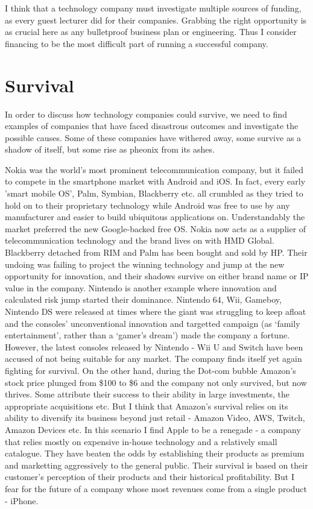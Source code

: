 \documentclass[twocolumn]{bmcart}%
\begin{document}
\par I think that a technology company must investigate multiple sources of funding, as every guest lecturer did for their companies. Grabbing the right opportunity is as crucial here as any bulletproof business plan or engineering. Thus I consider financing to be the most difficult part of running a successful company.

\section*{Survival}

In order to discuss how technology companies could survive, we need to find examples of companies that have faced disastrous outcomes and investigate the possible causes. Some of these companies have withered away, some survive as a shadow of itself, but some rise as pheonix from its ashes.\\

\par Nokia was the world's most prominent telecommunication company, but it failed to compete in the smartphone market with Android and iOS. In fact, every early 'smart mobile OS', Palm, Symbian, Blackberry etc. all crumbled as they tried to hold on to their proprietary technology while Android was free to use by any manufacturer and easier to build ubiquitous applications on. Understandably the market preferred the new Google-backed free OS. Nokia now acts as a supplier of telecommunication technology and the brand lives on with HMD Global. Blackberry detached from RIM and Palm has been bought and sold by HP. Their undoing was failing to project the winning technology and jump at the new opportunity for innovation, and their shadows survive on either brand name or IP value in the company. Nintendo is another example where innovation and calculated risk jump started their dominance. Nintendo 64, Wii, Gameboy, Nintendo DS were released at times where the giant was struggling to keep afloat and the consoles' unconventional innovation and targetted campaign (as `family entertainment', rather than a `gamer's dream') made the company a fortune. However, the latest consoles released by Nintendo - Wii U and Switch have been accused of not being suitable for any market. The company finds itself yet again fighting for survival. On the other hand, during the Dot-com bubble Amazon's stock price plunged from \$100 to \$6 and the company not only survived, but now thrives. Some attribute their success to their ability in large investments, the appropriate acquisitions etc. But I think that Amazon's survival relies on its ability to diversify its business beyond just retail - Amazon Video, AWS, Twitch, Amazon Devices etc. In this scenario I find Apple to be a renegade - a company that relies mostly on expensive in-house technology and a relatively small catalogue. They have beaten the odds by establishing their products as premium and marketting aggressively to the general public. Their survival is based on their customer's perception of their products and their historical profitability. But I fear for the future of a company whose most revenues come from a single product - iPhone.\\
\end{document}
